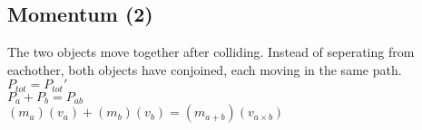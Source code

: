 \begin{adjustwidth}{1cm}{0pt}
    \subsection{Momentum (2)}
    \begin{flushleft}
        The two objects move together after colliding. Instead of seperating from eachother, both objects have conjoined, each moving in the same path.\newline\newline
        $P_{tot} = P_{tot}\prime$ \\
        \vspace*{10pt}
        $P_{a} + P_{b} = P_{ab}$ \\
        \vspace*{10pt}
        $(m_{a})(v_{a}) + (m_{b})(v_{b}) = (m_{a + b})(v_{a\times b})$
    \end{flushleft}
\end{adjustwidth}
